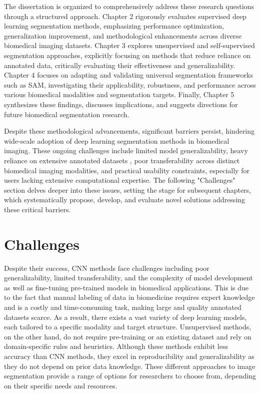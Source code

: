 \documentclass[./dissertation.tex]{subfiles}
\begin{document}

The dissertation is organized to comprehensively address these research questions through a structured approach. Chapter 2 rigorously evaluates supervised deep learning segmentation methods, emphasizing performance optimization, generalization improvement, and methodological enhancements across diverse biomedical imaging datasets. Chapter 3 explores unsupervised and self-supervised segmentation approaches, explicitly focusing on methods that reduce reliance on annotated data, critically evaluating their effectiveness and generalizability. Chapter 4 focuses on adapting and validating universal segmentation frameworks such as SAM, investigating their applicability, robustness, and performance across various biomedical modalities and segmentation targets. Finally, Chapter 5 synthesizes these findings, discusses implications, and suggests directions for future biomedical segmentation research.


Despite these methodological advancements, significant barriers persist, hindering wide-scale adoption of deep learning segmentation methods in biomedical imaging. These ongoing challenges include limited model generalizability, heavy reliance on extensive annotated datasets \cite{wang2021annotation}, poor transferability across distinct biomedical imaging modalities, and practical usability constraints, especially for users lacking extensive computational expertise. The following "Challenges" section delves deeper into these issues, setting the stage for subsequent chapters, which systematically propose, develop, and evaluate novel solutions addressing these critical barriers.

\section{Challenges}
Despite their success, CNN methods face challenges including poor generalizability, limited transferability, and the complexity of model development as well as fine-tuning pre-trained models in biomedical applications. This is due to the fact that manual labeling of data in biomedicine requires expert knowledge and is a costly and time-consuming task, making large and quality annotated datasets scarce. As a result, there exists a vast variety of deep learning models, each tailored to a specific modality and target structure. Unsupervised methods, on the other hand, do not require pre-training or an existing dataset and rely on domain-specific rules and heuristics. Although these methods exhibit less accuracy than CNN methods, they excel in reproducibility and generalizability as they do not depend on prior data knowledge. These different approaches to image segmentation provide a range of options for researchers to choose from, depending on their specific needs and resources.
\end{document}
